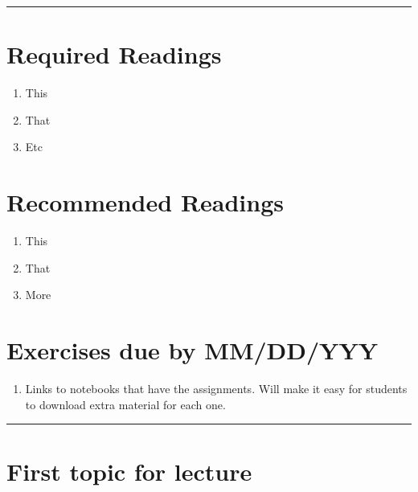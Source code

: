 \documentclass[]{book}
\providecommand{\tightlist}{%
  \setlength{\itemsep}{0pt}\setlength{\parskip}{0pt}}
\begin{document}
\begin{center}\rule{0.5\linewidth}{\linethickness}\end{center}

\hypertarget{required-readings}{%
\section*{Required Readings}\label{required-readings}}

\begin{enumerate}
\def\labelenumi{\arabic{enumi}.}
\tightlist
\item
  This
\item
  That
\item
  Etc
\end{enumerate}

\hypertarget{recommended-readings}{%
\section*{Recommended Readings}\label{recommended-readings}}

\begin{enumerate}
\def\labelenumi{\arabic{enumi}.}
\tightlist
\item
  This
\item
  That
\item
  More
\end{enumerate}

\hypertarget{exercises-due-by-mmddyyy}{%
\section*{Exercises due by MM/DD/YYY}\label{exercises-due-by-mmddyyy}}

\begin{enumerate}
\def\labelenumi{\arabic{enumi}.}
\tightlist
\item
  Links to notebooks that have the assignments. Will make it
  easy for students to download extra material for each one.
\end{enumerate}

\begin{center}\rule{0.5\linewidth}{\linethickness}\end{center}

\hypertarget{first-topic-for-lecture}{%
\section{First topic for lecture}\label{first-topic-for-lecture}}
\end{document}
